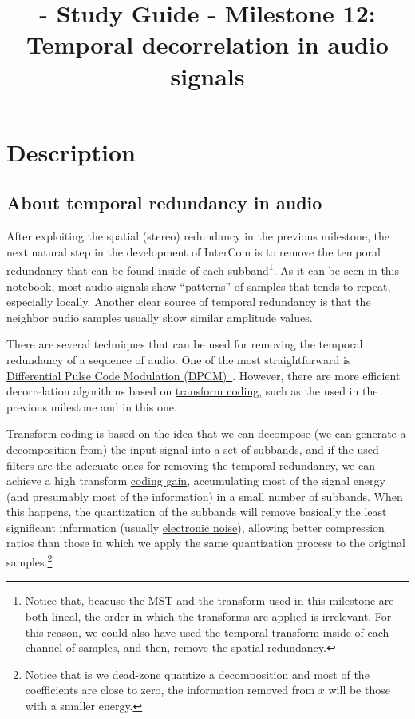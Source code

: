 
\title{\TM{} - Study Guide - Milestone 12: Temporal decorrelation in audio signals}

\maketitle

\section{Description}

\subsection{About temporal redundancy in audio}
After exploiting the spatial (stereo) redundancy in the previous
milestone, the next natural step in the development of InterCom is to
remove the temporal redundancy that can be found inside of each
subband\footnote{Notice that, beacuse the MST and the transform used
  in this milestone are both lineal, the order in which the transforms
  are applied is irrelevant. For this reason, we could also have used
  the temporal transform inside of each channel of samples, and then,
  remove the spatial redundancy.}. As it can be seen in this
\href{https://github.com/Tecnologias-multimedia/intercom/blob/master/docs/audio_viewer.ipynb}{notebook},
most audio signals show ``patterns'' of samples that tends to repeat,
especially locally. Another clear source of temporal redundancy is
that the neighbor audio samples usually show similar amplitude values.

There are several techniques that can be used for removing the
temporal redundancy of a sequence of audio. One of the most
straightforward is
\href{https://en.wikipedia.org/wiki/Differential_pulse-code_modulation}{Differential
  Pulse Code Modulation
  (DPCM)~\cite{sayood2017introduction}}. However, there are more
efficient decorrelation algorithms based on
\href{https://en.wikipedia.org/wiki/Transform_coding}{transform
  coding}, such as the used in the previous milestone and in this one.

Transform coding is based on the idea that we can decompose (we can
generate a decomposition from) the input signal into a set of
subbands, and if the used filters are the adecuate ones for removing
the temporal redundancy, we can achieve a high transform
\href{https://en.wikipedia.org/wiki/Coding_gain}{coding gain},
accumulating most of the signal energy (and presumably most of the
information) in a small number of subbands. When this happens, the
quantization of the subbands will remove basically the least
significant information (usually
\href{https://en.wikipedia.org/wiki/Noise_(electronics)}{electronic
  noise}), allowing better compression ratios than those in which we
apply the same quantization process to the original
samples.\footnote{Notice that is we dead-zone quantize a decomposition
and most of the coefficients are close to zero, the information
removed from $x$ will be those with a smaller energy.}

